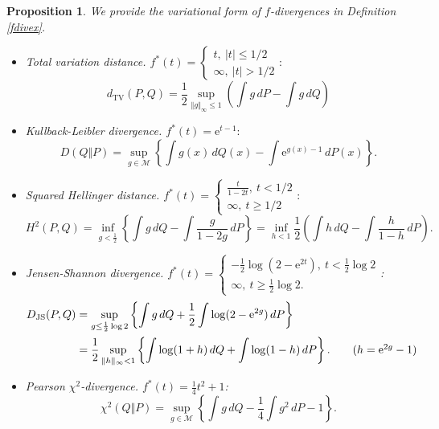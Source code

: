 \documentclass{article}
\numberwithin{equation}{section}
\newcommand{\e}{\mathrm{e}}
\theoremstyle{plain}
\newtheorem{proposition}[theorem]{Proposition}
\theoremstyle{definition}
\begin{document}
\begin{proposition} We provide the variational form of $f$-divergences in Definition \ref{fdivex}.
\begin{itemize}
	\item Total variation distance. $f^*(t) = \begin{cases}
		t,\ \vert t\vert\leq 1/2\\
		\infty,\ \vert t\vert > 1/2
	\end{cases}:$
	\begin{equation*}
		d_\mathrm{TV}(P,Q) = \frac{1}{2}\sup_{\Vert g\Vert_\infty \leq 1} \left(\int g\,dP-\int g\,dQ\right)
	\end{equation*}
	\item Kullback-Leibler divergence. $f^*(t) = \mathrm{e}^{t
		-1}:$
	\begin{equation*}
		D(Q\Vert P) = \sup_{g\in\mathcal{M}} \left\{\int g(x)\,dQ(x) - \int\e^{g(x)-1}\,dP(x)\right\}.
	\end{equation*}
	\item Squared Hellinger distance. $f^*(t)=\begin{cases}\frac{t}{1-2t},\ t<1/2\\
		\infty,\ t\geq 1/2\end{cases}:$
	\begin{equation*}
		H^2(P,Q) = \inf_{g<\frac{1}{2}}\left\{\int g\,dQ - \int \frac{g}{1-2g}\,dP\right\}=\inf_{h<1}\frac{1}{2}\left(\int h\,dQ - \int \frac{h}{1-h}\,dP\right).
	\end{equation*}
\item Jensen-Shannon divergence. $f^*(t) = \begin{cases}
	-\frac{1}{2}\log(2-\mathrm{e}^{2t}),\ t<\frac{1}{2}\log 2\\
	\infty,\ t \geq \frac{1}{2}\log 2.
\end{cases}$:
\begin{align*}
	D_{\mathrm{JS}}(P,Q) &= \sup_{g\leq\frac{1}{2}\log 2} \left\{\int g\,dQ +\frac{1}{2}\int \log(2-\e^{2g})\,dP\right\}\\
	&= \frac{1}{2}\sup_{\Vert h\Vert_\infty < 1} \left\{\int\log(1+h)\,dQ + \int \log(1-h)\,dP\right\}.\tag{$h=\e^{2g}-1$}
\end{align*}
	\item Pearson $\chi^2$-divergence.
	$f^*(t) = \frac{1}{4}t^2 + 1$:
	\begin{equation}
		\chi^2(Q\Vert P) = \sup_{g\in\mathcal{M}}\left\{\int g\,dQ - \frac{1}{4}\int g^2\,dP - 1\right\}.\label{pearsonvar}
	\end{equation}

\end{itemize}
\end{proposition}
\end{document}
